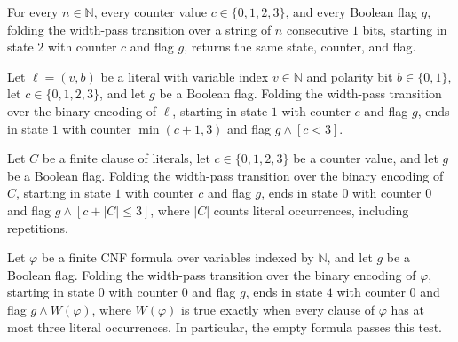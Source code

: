 \begin{lemma}
\label{Complexity.satWidth_index}
\leanok
{}
For every $n\in\mathbb{N}$, every counter value $c\in\{0,1,2,3\}$, and every Boolean
flag $g$, folding the width-pass transition over a string of $n$ consecutive $1$ bits,
starting in state $2$ with counter $c$ and flag $g$, returns the same state, counter,
and flag.
\end{lemma}

\begin{lemma}
\label{Complexity.satWidth_literal}
\leanok
{}
Let $\ell=(v,b)$ be a literal with variable index $v\in\mathbb{N}$ and polarity bit
$b\in\{0,1\}$, let $c\in\{0,1,2,3\}$, and let $g$ be a Boolean flag. Folding the
width-pass transition over the binary encoding of $\ell$, starting in state $1$ with
counter $c$ and flag $g$, ends in state $1$ with counter $\min(c+1,3)$ and flag
$g\wedge[c<3]$.
\end{lemma}

\begin{lemma}
\label{Complexity.satWidth_clause}
\leanok
{}
Let $C$ be a finite clause of literals, let $c\in\{0,1,2,3\}$ be a counter value, and
let $g$ be a Boolean flag. Folding the width-pass transition over the binary encoding of
$C$, starting in state $1$ with counter $c$ and flag $g$, ends in state $0$ with counter
$0$ and flag $g\wedge[c+|C|\le 3]$, where $|C|$ counts literal occurrences, including
repetitions.
\end{lemma}

\begin{lemma}
\label{Complexity.satWidth_formula}
\leanok
{}
Let $\varphi$ be a finite CNF formula over variables indexed by $\mathbb{N}$, and let
$g$ be a Boolean flag. Folding the width-pass transition over the binary encoding of
$\varphi$, starting in state $0$ with counter $0$ and flag $g$, ends in state $4$ with
counter $0$ and flag $g\wedge W(\varphi)$, where $W(\varphi)$ is true exactly when every
clause of $\varphi$ has at most three literal occurrences. In particular, the empty
formula passes this test.
\end{lemma}

